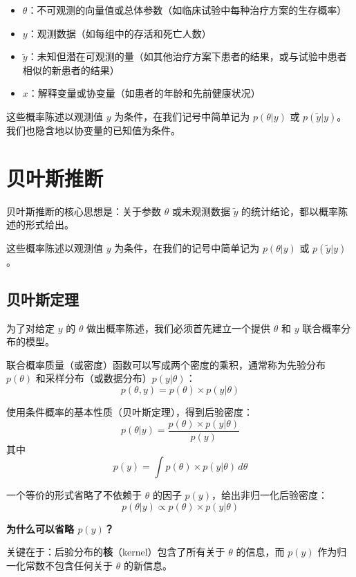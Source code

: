\begin{itemize}
  \item $\theta$：不可观测的向量值或总体参数（如临床试验中每种治疗方案的生存概率）

  \item $y$：观测数据（如每组中的存活和死亡人数）

  \item $\tilde{y}$：未知但潜在可观测的量（如其他治疗方案下患者的结果，或与试验中患者相似的新患者的结果）

  \item $x$：解释变量或协变量（如患者的年龄和先前健康状况）
\end{itemize}

这些概率陈述以观测值 $y$ 为条件，在我们记号中简单记为 $p(\theta|y)$ 或 $p(\tilde{y}|y)$。我们也隐含地以协变量的已知值为条件。

\section{贝叶斯推断}

贝叶斯推断的核心思想是：关于参数 $\theta$ 或未观测数据 $\tilde{y}$ 的统计结论，都以概率陈述的形式给出。

这些概率陈述以观测值 $y$ 为条件，在我们的记号中简单记为 $p(\theta|y)$ 或 $p(\tilde{y}|y)$。

\subsection{贝叶斯定理}

为了对给定 $y$ 的 $\theta$ 做出概率陈述，我们必须首先建立一个提供 $\theta$ 和 $y$ 联合概率分布的模型。

联合概率质量（或密度）函数可以写成两个密度的乘积，通常称为先验分布 $p(\theta)$ 和采样分布（或数据分布）$p(y|\theta)$：
\[
p(\theta, y) = p(\theta) \times p(y|\theta)
\]

使用条件概率的基本性质（贝叶斯定理），得到后验密度：
\[
p(\theta|y) = \frac{p(\theta) \times p(y|\theta)}{p(y)}
\]
其中
\[
p(y) = \int p(\theta) \times p(y|\theta) \, d\theta
\]

一个等价的形式省略了不依赖于 $\theta$ 的因子 $p(y)$，给出非归一化后验密度：
\[
p(\theta|y) \propto p(\theta) \times p(y|\theta)
\]

\textbf{为什么可以省略 $p(y)$？}

关键在于：后验分布的\textbf{核}（kernel）包含了所有关于 $\theta$ 的信息，而 $p(y)$ 作为归一化常数不包含任何关于 $\theta$ 的新信息。


